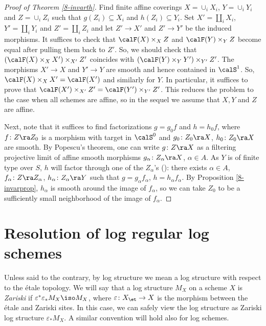 \documentclass[10pt]{../fichiers-configuration-latex/smfart}
\begin{document}
\begin{proof}[Proof of Theorem \ref{8-invarth}] Find finite
affine coverings $X=\cup_i X_i$, $Y=\cup_i Y_i$ and $Z=\cup_i
Z_i$ such that $g(Z_i)\subseteq X_i$ and $h(Z_i)\subseteq
Y_i$. Set $X'=\coprod_i X_i$, $Y'=\coprod_i Y_i$ and
$Z'=\coprod_i Z_i$ and let $Z'\to X'$ and $Z'\to Y'$ be the
induced morphisms. It suffices to check that $\calF(X)\times_XZ$
and $\calF(Y)\times_YZ$ become equal after pulling them back to
$Z'$. So, we should check that $(\calF(X)\times_XX')\times_{X'}Z'$
coincides with $(\calF(Y)\times_YY')\times_{Y'}Z'$. The
morphisms $X'\to X$ and $Y'\to Y$ are smooth and hence
contained in $\calS^1$. So, $\calF(X)\times_XX'=\calF(X')$
and similarly for $Y$. In particular, it suffices to prove that
$\calF(X')\times_{X'}Z'=\calF(Y')\times_{Y'}Z'$. This reduces the
problem to the case when all schemes are affine, so in the sequel
we assume that $X,Y$ and $Z$ are affine.

Next, note that it suffices to find factorizations $g = g_0f$ and $h
= h_0f$, where $f{\colon} Z \ra Z_0$ is a morphism with target in
$\calS^0$ and $g_0{\colon} Z_0 \ra X$, $h_0{\colon} Z_0 \ra X$ are
smooth. By Popescu's theorem, one can write $ g {\colon} Z \ra X$ as
a filtering projective limit of affine smooth morphisms $g_{\alpha}
{\colon} Z_{\alpha} \ra X$, $\alpha \in A$. As $Y$ is of finite
type over $S$, $h$ will factor through one of the $Z_{\alpha}$'s
(): there exists $\alpha \in A$, $f_{\alpha}
{\colon}Z \ra Z_{\alpha} $, $h_{\alpha} {\colon} Z_{\alpha} \ra Y$
such that $g = g_{\alpha}f_{\alpha}$, $h = h_{\alpha}f_{\alpha}$. By
Proposition \ref{8-invarprop}, $h_{\alpha}$ is smooth around the
image of $f_{\alpha}$, so we can take $Z_0$ to be a sufficiently
small neighborhood of the image of $f_\alpha$.  \end{proof}

\section{Resolution of log regular log schemes}\label{8-logregsec}
Unless said to the contrary, by log structure we mean
a log structure with respect to the \'etale topology. We
will say that a log structure $M_X$ on a scheme $X$ is {\em
Zariski} if $\varepsilon^*\varepsilon_*M_X\iso M_X$, where
$\varepsilon{\colon}X_\et\to X$ is the morphism between the \'etale
and Zariski sites. In this case, we can safely view the log structure
as Zariski log structure $\varepsilon_*M_X$. A similar convention
will hold also for log schemes.
\end{document}
